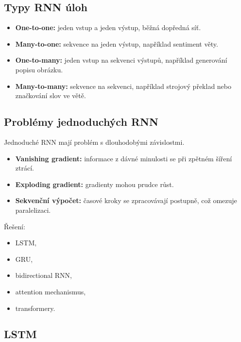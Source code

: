 \subsection{Typy RNN úloh}

\begin{itemize}
    \item \textbf{One-to-one:}
    jeden vstup a jeden výstup, běžná dopředná síť.
    
    \item \textbf{Many-to-one:}
    sekvence na jeden výstup, například sentiment věty.
    
    \item \textbf{One-to-many:}
    jeden vstup na sekvenci výstupů, například generování popisu obrázku.
    
    \item \textbf{Many-to-many:}
    sekvence na sekvenci, například strojový překlad nebo značkování slov ve větě.
\end{itemize}

\subsection{Problémy jednoduchých RNN}

Jednoduché RNN mají problém s dlouhodobými závislostmi.

\begin{itemize}
    \item \textbf{Vanishing gradient:}
    informace z dávné minulosti se při zpětném šíření ztrácí.
    
    \item \textbf{Exploding gradient:}
    gradienty mohou prudce růst.
    
    \item \textbf{Sekvenční výpočet:}
    časové kroky se zpracovávají postupně, což omezuje paralelizaci.
\end{itemize}

Řešení:
\begin{itemize}
    \item LSTM,
    \item GRU,
    \item bidirectional RNN,
    \item attention mechanismus,
    \item transformery.
\end{itemize}

\subsection{LSTM}

